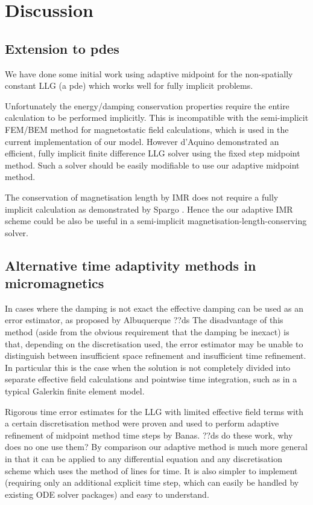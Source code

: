 \section{Discussion}

\subsection{Extension to pdes}

We have done some initial work using adaptive midpoint for the non-spatially constant LLG (\ie a pde) which works well for fully implicit problems.

Unfortunately the energy/damping conservation properties require the entire calculation to be performed implicitly.
This is incompatible with the semi-implicit FEM/BEM method for magnetostatic field calculations,\cite{Koehler1997} which is used in the current implementation of our model.
However d'Aquino \etal demonstrated an efficient, fully implicit finite difference LLG solver using the fixed step midpoint method\cite{DAquino2005}.
Such a solver should be easily modifiable to use our adaptive midpoint method.

The conservation of magnetisation length by IMR does not require a fully implicit calculation as demonstrated by Spargo \etal\cite{Spargo2003a}.
Hence the our adaptive IMR scheme could be also be useful in a semi-implicit magnetisation-length-conserving solver.


\subsection{Alternative time adaptivity methods in micromagnetics}
\label{sec:altern-time-adapt}

In cases where the damping is not exact the effective damping can be used as an error estimator, as proposed by Albuquerque \etal\cite{Albuquerque2001}
??ds The disadvantage of this method (aside from the obvious requirement that the damping be inexact) is that, depending on the discretisation used, the error estimator may be unable to distinguish between insufficient space refinement and insufficient time refinement.
In particular this is the case when the solution is not completely divided into separate effective field calculations and pointwise time integration, such as in a typical Galerkin finite element model.

Rigorous time error estimates for the LLG with limited effective field terms with a certain discretisation method were proven and used to perform adaptive refinement of midpoint method time steps by Banas.\cite{Banas-thesis}
??ds do these work, why does no one use them?
By comparison our adaptive method is much more general in that it can be applied to any differential equation and any discretisation scheme which uses the method of lines for time.
It is also simpler to implement (requiring only an additional explicit time step, which can easily be handled by existing ODE solver packages) and easy to understand.


